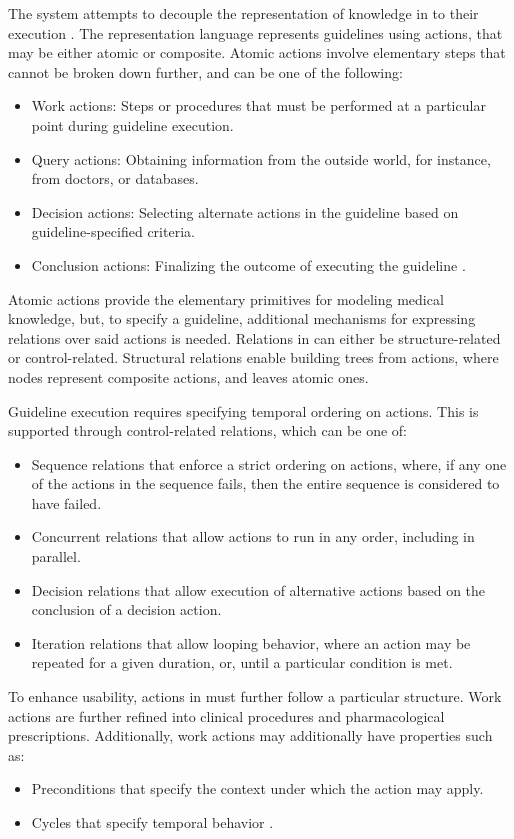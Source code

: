 The \GLARE{} system attempts to decouple the representation of knowledge
in \BPGs{} to their execution \cite{TerenzianiAIM01}. The \GLARE{} representation
language represents guidelines using actions, that may be either atomic or
composite. Atomic actions involve elementary steps that cannot be broken
down further, and can be one of the following:
\begin{itemize}
  \item Work actions: Steps or procedures that must be
    performed at a particular point during guideline execution.
  \item Query actions: Obtaining information from the outside world,
    for instance, from doctors, or databases.
  \item Decision actions: Selecting alternate actions in the guideline
    based on guideline-specified criteria.
  \item Conclusion actions: Finalizing the outcome of
    executing the guideline .
\end{itemize}
Atomic actions provide the elementary primitives for modeling
medical knowledge, but, to specify a guideline, additional mechanisms for
expressing relations over said actions is needed. Relations in
\GLARE{} can either be structure-related or control-related.
Structural relations enable building trees from actions, where
nodes represent composite actions, and leaves atomic ones.

Guideline execution requires specifying temporal ordering on
actions. This is supported through control-related relations, which
can be one of:
\begin{itemize}
  \item Sequence relations that enforce a strict ordering on actions, where,
    if any one of the actions in the sequence fails, then the entire sequence
    is considered to have failed.
  \item Concurrent relations that allow actions to run in any order, including
    in parallel.
  \item Decision relations that allow execution of alternative actions based
    on the conclusion of a decision action.
  \item Iteration relations that allow looping behavior, where
    an action may be repeated for a given duration, or, until a particular
    condition is met.
\end{itemize}

To enhance usability, actions in \GLARE{} must further follow a particular
structure. Work actions are further refined into clinical procedures and
pharmacological prescriptions. Additionally, work actions may additionally
have properties such as:
\begin{itemize}
  \item Preconditions that specify the context under which the action may apply.
  \item Cycles that specify temporal behavior \cite{TerenzianiAIM01}.
\end{itemize}

